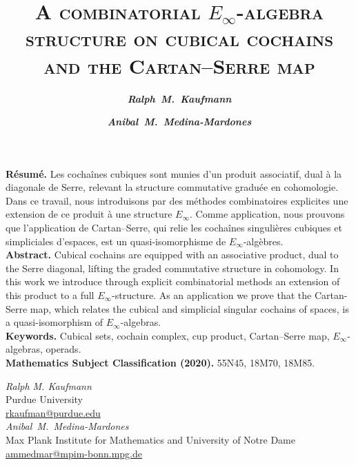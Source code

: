 \documentclass[12pt]{article}
\title{\vskip 5pt  \bf  \textsc{A combinatorial $E_\infty$-algebra structure on cubical cochains and the Cartan--Serre map}}
\author{
	\itshape\bfseries {Ralph~M.~Kaufmann} \and
	\itshape\bfseries {Anibal~M.~Medina-Mardones}
}
\begin{document}
	\maketitle
	\cfoot{}
	\thispagestyle{empty}
	\vskip 25pt
	\begin{adjustwidth}{0.5cm}{0.5cm}
		{\small
			{\bf R\'esum\'e.} Les cochaînes cubiques sont munies d'un produit associatif, dual à la diagonale de Serre, relevant la structure commutative graduée en cohomologie.
			Dans ce travail, nous introduisons par des méthodes combinatoires explicites une extension de ce produit à une structure $E_\infty$.
			Comme application, nous prouvons que l'application de Cartan--Serre, qui relie les cochaînes singulières cubiques et simpliciales d'espaces, est un quasi-isomorphisme de $E_\infty$-algèbres. \\
			{\bf Abstract.} Cubical cochains are equipped with an associative product, dual to the Serre diagonal, lifting the graded commutative structure in cohomology.
			In this work we introduce through explicit combinatorial methods an extension of this product to a full $E_\infty$-structure.
			As an application we prove that the Cartan-Serre map, which relates the cubical and simplicial singular cochains of spaces, is a quasi-isomorphism of $E_\infty$-algebras. \\
			{\bf Keywords.} Cubical sets, cochain complex, cup product, Cartan--Serre map, $E_\infty$-algebras, operads. \\
			{\bf Mathematics Subject Classification (2020).} 55N45, 18M70, 18M85.
		}
	\end{adjustwidth}

	
	
	
	
	
	

	\sloppy
	\printbibliography

	\noindent \textit{Ralph M. Kaufmann} \\
	Purdue University \\
	\href{mailto:rkaufman@purdue.edu}{rkaufman@purdue.edu} \\
	\newline
	\noindent \textit{Anibal~M.~Medina-Mardones} \\
	Max Plank Institute for Mathematics and University of Notre Dame \\
	\href{mailto:ammedmar@mpim-bonn.mpg.de}{ammedmar@mpim-bonn.mpg.de}
\end{document}
